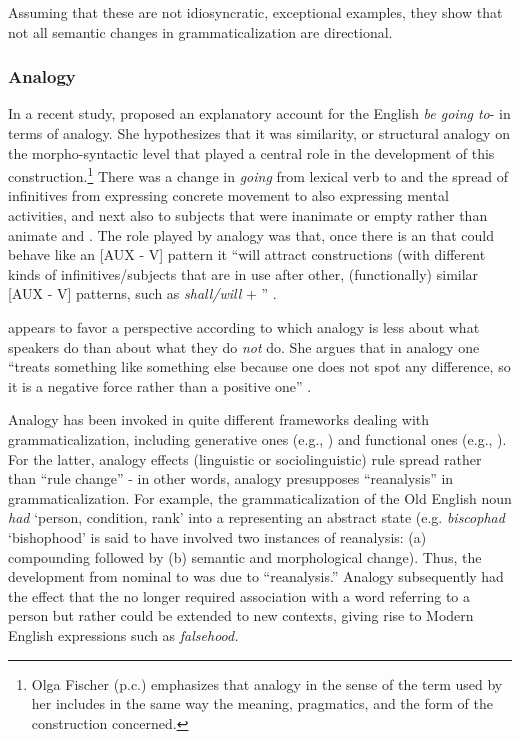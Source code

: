 \documentclass[output=paper]{langsci/langscibook}
\begin{document}
  Assuming that these are not idiosyncratic, exceptional examples, they show that not all semantic changes in grammaticalization are directional. 



\subsubsection{Analogy}\label{sec:heine:4.1.6}



In a recent study, \citet{Fischer2013} proposed an explanatory account for the English \textit{be going to}- in terms of analogy. She hypothesizes that it was similarity, or structural analogy on the morpho-syntactic level that played a central role in the development of this  construction.\footnote{Olga Fischer (p.c.) emphasizes that analogy in the sense of the term used by her includes in the same way the meaning, pragmatics, and the form of the construction concerned.} There was a change in \textit{going} from lexical verb to  and the spread of infinitives from expressing concrete movement to also expressing mental activities, and next also to subjects that were inanimate or empty rather than animate and . The role played by analogy was that, once there is an  that could behave like an [AUX - V] pattern it “will attract constructions (with different kinds of infinitives/subjects that are in use after other, (functionally) similar [AUX - V] patterns, such as \textit{shall/will} + ” \citep[522]{Fischer2013}.



\citet{Fischer2013} appears to favor a perspective according to which analogy is less about what speakers do than about what they do \textit{not} do. She argues that in analogy one “treats something like something else because one does not spot any difference, so it is a negative force rather than a positive one” \citep[519]{Fischer2013}. 



Analogy has been invoked in quite different frameworks dealing with grammaticalization, including generative ones (e.g., \citealt{Kiparsky2012}) and functional ones (e.g., \citealt[39--40]{Hopper2003}). For the latter, analogy effects (linguistic or sociolinguistic) rule spread rather than “rule change” - in other words, analogy presupposes “reanalysis” in grammaticalization. For example, the grammaticalization of the Old English noun \textit{had} ‘person, condition, rank’ into a  representing an abstract state (e.g. \textit{biscophad} ‘bishophood’ is said to have involved two instances of reanalysis: (a) compounding followed by (b) semantic and morphological change). Thus, the development from nominal to  was due to “reanalysis.” Analogy subsequently had the effect that the  no longer required association with a word referring to a person but rather could be extended to new contexts, giving rise to Modern English expressions such as \textit{falsehood.} 
\end{document}
